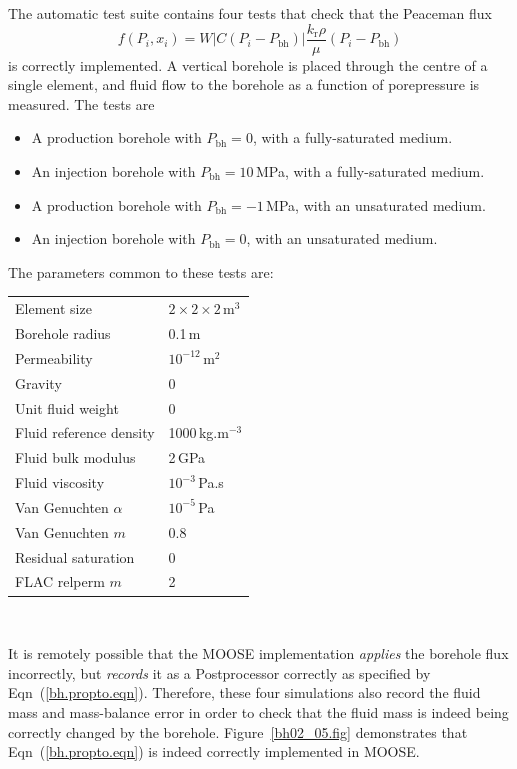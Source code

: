 \documentclass[]{scrreprt}
\begin{document}
The automatic test suite contains four tests that check that the Peaceman flux
\begin{equation}
f(P_{i}, x_{i}) =
W \left|C(P_{i}-P_{\mathrm{bh}})\right|
\frac{k_{\mathrm{r}}\rho}{\mu}(P_{i} - P_{\mathrm{bh}})
\label{bh.propto.eqn}
\end{equation}
is correctly implemented.  A vertical borehole is placed through the
centre of a single element, and fluid flow to the borehole as a
function of porepressure is measured.  The tests are
\begin{itemize}
\item A production borehole with $P_{\mathrm{bh}} = 0$, with a
  fully-saturated medium.
\item An injection borehole with $P_{\mathrm{bh}} = 10$\,MPa, with a
  fully-saturated medium.
\item A production borehole with $P_{\mathrm{bh}} = -1$\,MPa, with an
  unsaturated medium.
\item An injection borehole with $P_{\mathrm{bh}} = 0$, with an
  unsaturated medium.
\end{itemize}
The parameters common to these tests are:
\begin{center}
\begin{tabular}{|ll|}
\hline
Element size & $2\times 2\times 2$\,m$^{3}$ \\
Borehole radius & 0.1\,m \\
Permeability & $10^{-12}$\,m$^{2}$ \\
Gravity & 0 \\
Unit fluid weight & 0 \\
Fluid reference density & 1000\,kg.m$^{-3}$ \\
Fluid bulk modulus & 2\,GPa \\
Fluid viscosity & $10^{-3}$\,Pa.s \\
Van Genuchten $\alpha$ & $10^{-5}$\,Pa \\
Van Genuchten $m$ & 0.8  \\
Residual saturation & 0 \\
FLAC relperm $m$ & 2 \\
\hline
\end{tabular} \\
\end{center}
It is remotely possible that the MOOSE implementation {\em applies}
the borehole flux incorrectly, but {\em records} it as a Postprocessor
correctly as specified by Eqn~(\ref{bh.propto.eqn}).  Therefore, these
four simulations also record the fluid mass and mass-balance error in
order to check that the fluid mass is indeed being correctly changed
by the borehole.  Figure~\ref{bh02_05.fig} demonstrates that
Eqn~(\ref{bh.propto.eqn}) is indeed correctly implemented in MOOSE.
\end{document}
